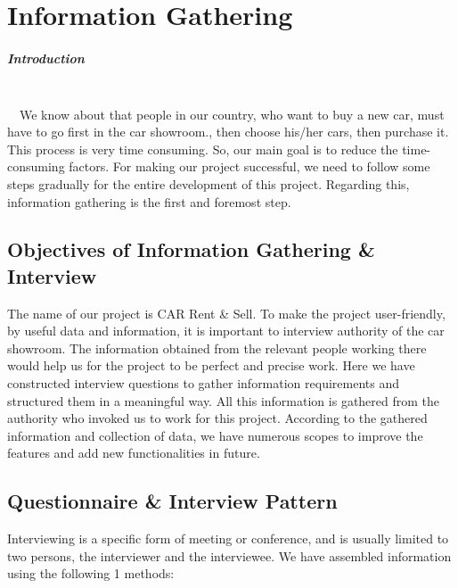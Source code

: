 \chapter{Information Gathering}

\noindent 
\paragraph{\Large Introduction }\textbf{}\\~~We know about that people in our country, who want to buy a new car, must have to go first in the car showroom., then choose his/her cars, then purchase it. This process is very time consuming. So, our main goal is to reduce the time-consuming factors. For making our project successful, we need to follow some steps gradually for the entire development of this project. Regarding this, information gathering is the first and foremost step. \\


\noindent 

\noindent 
\section{ Objectives of Information Gathering  \&  \newline Interview}

\noindent The name of our project is CAR Rent \& Sell. To make the project user-friendly, by useful data and information, it is important to interview authority of the car showroom. The information obtained from the relevant people working there would help us for the project to be perfect and precise work. Here we have constructed interview questions to gather information requirements and structured them in a meaningful way. All this information is gathered from the authority who invoked us to work for this project. According to the gathered information and collection of data, we have numerous scopes to improve the features and add new functionalities in future.


\noindent 

\noindent 

\noindent 
\section{ Questionnaire \& Interview Pattern}

\noindent Interviewing is a specific form of meeting or conference, and is usually limited to two persons, the interviewer and the interviewee. We have assembled information using the following 1 methods:

